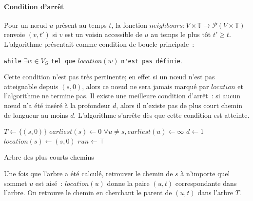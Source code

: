 \documentclass[12pt,a4paper]{article}
\begin{document}
\paragraph{Condition d'arrêt}
Pour un nœud \(u\) présent au temps \(t\), la fonction
\(neighbours : V \times \mathbb{T} \to \mathcal{P}(V \times
\mathbb{T})\) renvoie \((v, t')\) si \(v\) est un voisin accessible de
\(u\) au temps le plus tôt \(t' \geq t\).\\

L'algorithme présentait comme condition de boucle principale~:
\begin{center}
  \verb|while| \(\exists w \in V_G\) \verb|tel que| \(location(w)\)
  \verb|n'est pas définie|.
\end{center}
Cette condition n'est pas très pertinente; en effet si un nœud n'est
pas atteignable depuis \((s, 0)\), alors ce nœud ne sera jamais marqué
par \(location\) et l'algorithme ne termine pas. Il existe une
meilleure condition d'arrêt~: si aucun nœud n'a été inséré à la
profondeur \(d\), alors il n'existe pas de plus court chemin de
longueur au moins \(d\). L'algorithme s'arrête dès que cette condition
est atteinte.\\

\begin{algorithm}[H]
  \DontPrintSemicolon{}
  \(T \leftarrow \{(s, 0)\}\)\;
  \(earliest(s) \leftarrow 0\)\;
  \(\forall u \neq s, earliest(u) \leftarrow \infty\)\;
  \(d \leftarrow 1\)\;
  \(location(s) \leftarrow (s, 0)\)\;
  \(run \leftarrow \top\)\;
  \caption{Arbre des plus courts chemins\label{alg:shortest_path}}
\end{algorithm}

Une fois que l'arbre a été calculé, retrouver le chemin de \(s\) à
n'importe quel sommet \(u\) est aisé~: \(location(u)\) donne la paire
\((u, t)\) correspondante dans l'arbre. On retrouve le chemin en
cherchant le parent de \((u, t)\) dans l'arbre \(T\).
\end{document}
